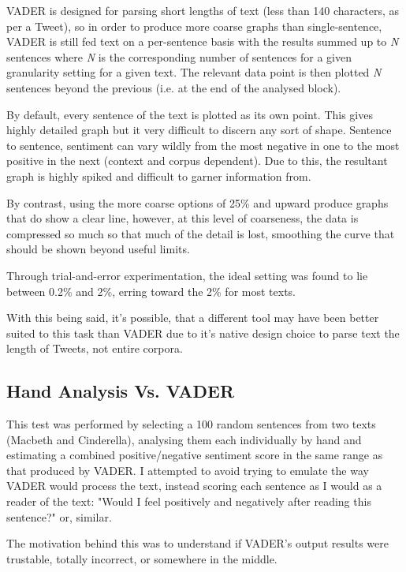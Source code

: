 \documentclass{article}
\begin{document}
        VADER is designed for parsing short lengths of text (less than 140 characters, as per a Tweet), so in order to produce more coarse graphs than single-sentence, VADER is still fed text on a per-sentence basis with the results summed up to \emph{N} sentences where \emph{N} is the corresponding number of sentences for a given granularity setting for a given text. The relevant data point is then plotted \emph{N} sentences beyond the previous (i.e. at the end of the analysed block).

        By default, every sentence of the text is plotted as its own point. This gives highly detailed graph but it very difficult to discern any sort of shape. Sentence to sentence, sentiment can vary wildly from the most negative in one to the most positive in the next (context and corpus dependent). Due to this, the resultant graph is highly spiked and difficult to garner information from.

        By contrast, using the more coarse options of 25\% and upward produce graphs that do show a clear line, however, at this level of coarseness, the data is compressed so much so that much of the detail is lost, smoothing the curve that should be shown beyond useful limits.

        Through trial-and-error experimentation, the ideal setting was found to lie between 0.2\% and 2\%, erring toward the 2\% for most texts.

        
        With this being said, it's possible, that a different tool may have been better suited to this task than VADER due to it's native design choice to parse text the length of Tweets, not entire corpora.
    \subsection{Hand Analysis Vs. VADER}
        This test was performed by selecting a 100 random sentences from two texts (Macbeth and Cinderella), analysing them each individually by hand and estimating a combined positive/negative sentiment score in the same range as that produced by VADER. I attempted to avoid trying to emulate the way VADER would process the text, instead scoring each sentence as I would as a reader of the text: "Would I feel positively and negatively after reading this sentence?" or, similar.
        
        The motivation behind this was to understand if VADER's output results were trustable, totally incorrect, or somewhere in the middle. 
\end{document}
